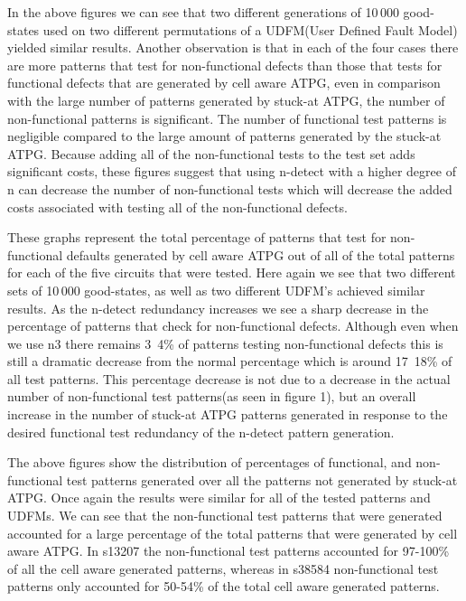 \documentclass[12pt]{article}
\begin{document}
In the above figures we can see that two different generations of 10\,000 good-states used on two different permutations of a UDFM(User Defined Fault Model) yielded similar results. Another observation is that in each of the four cases there are more patterns that test for non-functional defects than those that tests for functional defects that are generated by cell aware ATPG, even in comparison with the large number of patterns generated by stuck-at ATPG, the number of non-functional patterns is significant. The number of functional test patterns is negligible compared to the large amount of patterns generated by the stuck-at ATPG. Because adding all of the non-functional tests to the test set adds significant costs, these figures suggest that using n-detect with a higher degree of n can decrease the number of non-functional tests which will decrease the added costs associated with testing all of the non-functional defects. 

These graphs represent the total percentage of patterns that test for non-functional defaults generated by cell aware ATPG out of all of the total patterns for each of the five circuits that were tested. Here again we see that two different sets of 10\,000 good-states, as well as two different UDFM's achieved similar results. As the n-detect redundancy increases we see a sharp decrease in the percentage of patterns that check for non-functional defects. Although even when we use n3 there remains 3~4\% of patterns testing non-functional defects this is still a dramatic decrease from the normal percentage which is around 17~18\% of all test patterns. This percentage decrease is not due to a decrease in the actual number of non-functional test patterns(as seen in figure 1), but an overall increase in the number of stuck-at ATPG patterns generated in response to the desired functional test redundancy of the n-detect pattern generation. 

The above figures show the distribution of percentages of functional, and non-functional test patterns generated over all the patterns not generated by stuck-at ATPG. Once again the results were similar for all of the tested patterns and UDFMs. We can see that the non-functional test patterns that were generated accounted for a large percentage of the total patterns that were generated by cell aware ATPG. In s13207 the non-functional test patterns accounted for 97-100\% of all the cell aware generated patterns, whereas in s38584 non-functional test patterns only accounted for 50-54\% of the total cell aware generated patterns. 
\end{document}
